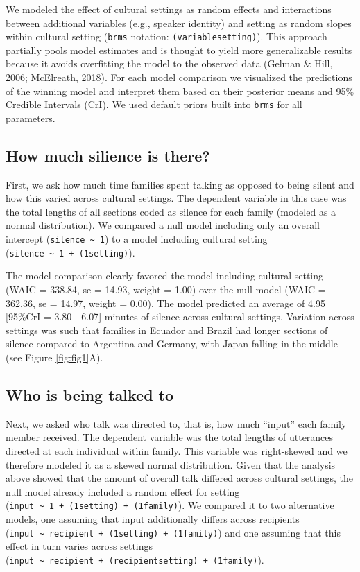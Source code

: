 \documentclass[
  man,floatsintext]{apa6}
\begin{document}
We modeled the effect of cultural settings as random effects and interactions between additional variables (e.g., speaker identity) and setting as random slopes within cultural setting (\texttt{brms} notation: \texttt{(variable\textbar{}setting)}). This approach partially pools model estimates and is thought to yield more generalizable results because it avoids overfitting the model to the observed data (Gelman \& Hill, 2006; McElreath, 2018). For each model comparison we visualized the predictions of the winning model and interpret them based on their posterior means and 95\% Credible Intervals (CrI). We used default priors built into \texttt{brms} for all parameters.

\hypertarget{how-much-silience-is-there}{%
\subsection{How much silience is there?}\label{how-much-silience-is-there}}

First, we ask how much time families spent talking as opposed to being silent and how this varied across cultural settings. The dependent variable in this case was the total lengths of all sections coded as silence for each family (modeled as a normal distribution). We compared a null model including only an overall intercept (\texttt{silence\ \textasciitilde{}\ 1}) to a model including cultural setting (\texttt{silence\ \textasciitilde{}\ 1\ +\ (1\textbar{}setting)}).

The model comparison clearly favored the model including cultural setting (WAIC = 338.84, se = 14.93, weight = 1.00) over the null model (WAIC = 362.36, se = 14.97, weight = 0.00). The model predicted an average of 4.95 {[}95\%CrI = 3.80 - 6.07{]} minutes of silence across cultural settings. Variation across settings was such that families in Ecuador and Brazil had longer sections of silence compared to Argentina and Germany, with Japan falling in the middle (see Figure \ref{fig:fig1}A).

\hypertarget{who-is-being-talked-to}{%
\subsection{Who is being talked to}\label{who-is-being-talked-to}}

Next, we asked who talk was directed to, that is, how much ``input'' each family member received. The dependent variable was the total lengths of utterances directed at each individual within family. This variable was right-skewed and we therefore modeled it as a skewed normal distribution. Given that the analysis above showed that the amount of overall talk differed across cultural settings, the null model already included a random effect for setting (\texttt{input\ \textasciitilde{}\ 1\ +\ (1\textbar{}setting)\ +\ (1\textbar{}family)}). We compared it to two alternative models, one assuming that input additionally differs across recipients (\texttt{input\ \textasciitilde{}\ recipient\ +\ (1\textbar{}setting)\ +\ (1\textbar{}family)}) and one assuming that this effect in turn varies across settings (\texttt{input\ \textasciitilde{}\ recipient\ +\ (recipient\textbar{}setting)\ +\ (1\textbar{}family)}).
\end{document}
